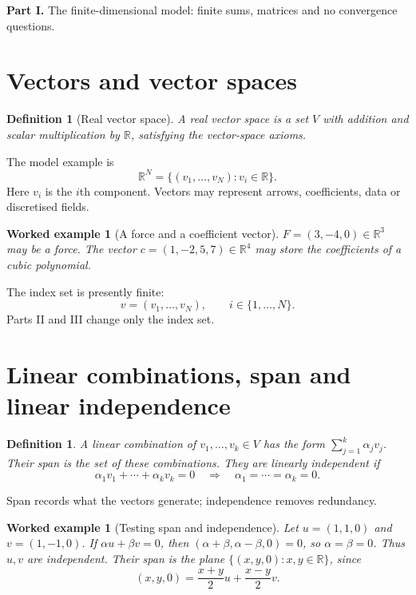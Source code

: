 \documentclass[11pt,a5paper,oneside,openany]{scrreprt}
\theoremstyle{notes}
\theoremstyle{definitions}
\newtheorem{definition}[theorem]{Definition}
\newtheorem{example}[theorem]{Worked example}
\newcommand{\R}{\mathbb{R}}
\begin{document}
\begin{summarybox}
\textbf{Part I.}  The finite-dimensional model: finite sums, matrices and no
convergence questions.
\end{summarybox}

\section{Vectors and vector spaces}

\begin{definition}[Real vector space]
A real vector space is a set $V$ with addition and scalar multiplication by
$\R$, satisfying the vector-space axioms.
\end{definition}

The model example is
\[
  \R^N=\{(v_1,\ldots,v_N):v_i\in\R\}.
\]
Here $v_i$ is the $i$th component.  Vectors may represent arrows,
coefficients, data or discretised fields.

\begin{example}[A force and a coefficient vector]
$F=(3,-4,0)\in\R^3$ may be a force.  The vector
$c=(1,-2,5,7)\in\R^4$ may store the coefficients of a cubic polynomial.
\end{example}

\begin{bridge}
The index set is presently finite:
\[
   v=(v_1,\ldots,v_N),\qquad i\in\{1,\ldots,N\}.
\]
Parts II and III change only the index set.
\end{bridge}

\section{Linear combinations, span and linear independence}

\begin{definition}
A \emph{linear combination} of $v_1,\ldots,v_k\in V$ has the form
$\sum_{j=1}^k\alpha_jv_j$.  Their span is the set of these combinations.  They
are linearly independent if
\[
  \alpha_1v_1+\cdots+\alpha_kv_k=0
  \quad\Longrightarrow\quad
  \alpha_1=\cdots=\alpha_k=0.
\]
\end{definition}

Span records what the vectors generate; independence removes redundancy.

\begin{example}[Testing span and independence]
Let $u=(1,1,0)$ and $v=(1,-1,0)$.  If $\alpha u+\beta v=0$, then
$(\alpha+\beta,\alpha-\beta,0)=0$, so $\alpha=\beta=0$.  Thus $u,v$ are
independent.  Their span is the plane $\{(x,y,0):x,y\in\R\}$, since
\[
  (x,y,0)=\frac{x+y}{2}u+\frac{x-y}{2}v.
\]
\end{example}
\end{document}

